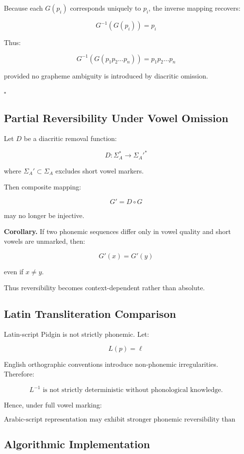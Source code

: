 \documentclass[12pt]{article}
\begin{document}
Because each \( G(p_i) \) corresponds uniquely to \( p_i \), the inverse mapping recovers:

\[
G^{-1}(G(p_i)) = p_i
\]

Thus:

\[
G^{-1}(G(p_1 p_2 \dots p_n)) = p_1 p_2 \dots p_n
\]

provided no grapheme ambiguity is introduced by diacritic omission.

\hfill \( \square \)

\subsection{Partial Reversibility Under Vowel Omission}

Let \( D \) be a diacritic removal function:

\[
D : \Sigma_A^* \rightarrow \Sigma_A'^*
\]

where \( \Sigma_A' \subset \Sigma_A \) excludes short vowel markers.

Then composite mapping:

\[
G' = D \circ G
\]

may no longer be injective.

\textbf{Corollary.}  
If two phonemic sequences differ only in vowel quality and short vowels are unmarked, then:

\[
G'(x) = G'(y)
\]

even if \( x \neq y \).

Thus reversibility becomes context-dependent rather than absolute.

\subsection{Latin Transliteration Comparison}

Latin-script Pidgin is not strictly phonemic. Let:

\[
L(p) = \ell
\]

English orthographic conventions introduce non-phonemic irregularities. Therefore:

\[
L^{-1} \text{ is not strictly deterministic without phonological knowledge.}
\]

Hence, under full vowel marking:

\[
\text{Arabic-script representation may exhibit stronger phonemic reversibility than Latin representation.}
\]

\subsection{Algorithmic Implementation}
\end{document}
